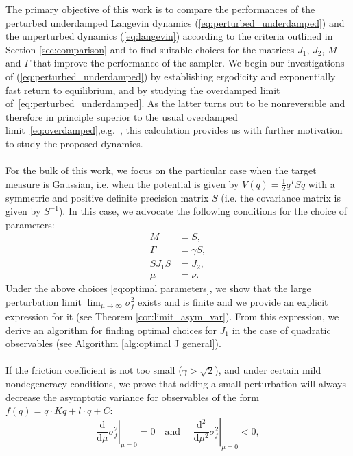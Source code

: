 
The primary objective of this work is to compare the performances of the perturbed underdamped Langevin dynamics (\ref{eq:perturbed_underdamped}) and the unperturbed dynamics (\ref{eq:langevin}) according to the criteria outlined in Section \ref{sec:comparison} and to find suitable choices for the matrices $J_{1}$, $J_{2}$, $M$ and $\Gamma$ that improve the performance of the sampler.  We begin our investigations of (\ref{eq:perturbed_underdamped}) by establishing ergodicity and exponentially fast return to equilibrium, and by studying the overdamped limit of~\eqref{eq:perturbed_underdamped}. As the latter turns out to be nonreversible and therefore in principle superior to the usual overdamped limit~\eqref{eq:overdamped},e.g.~\cite{Hwang2005}, this calculation provides us with further motivation to study the proposed dynamics.
\\\\
For the bulk of this work, we focus on the particular case when the target measure is Gaussian, i.e. when the potential is given by $V(q)=\frac{1}{2}q^{T}Sq$
with a symmetric and positive definite precision matrix $S$ (i.e. the covariance matrix is given by $S^{-1}$). In this
case, we advocate the following conditions for the choice of parameters:\begin{subequations}
	\label{eq:optimal parameters}
	\begin{align}
	M & =S,\label{eq:M=00003DS}\\
	\Gamma & =\gamma S,\\
	SJ_{1}S & =J_{2},\label{eq: perturbation condition}\\
	\mu & =\nu.
	\end{align}
\end{subequations}
Under the above choices \eqref{eq:optimal parameters}, we show that the large perturbation limit $\lim_{\mu\rightarrow\infty} \sigma_f^2$ exists and is finite and we provide an explicit expression for it (see Theorem \ref{cor:limit_asym_var}). From this expression, we derive an algorithm for finding optimal choices for $J_1$ in the case of quadratic observables (see Algorithm \ref{alg:optimal J general}).
\\\\
If the friction coefficient is not too small ($\gamma > \sqrt {2}$), and under certain mild nondegeneracy conditions, we prove that adding a small perturbation will always decrease the asymptotic variance for observables of the form $f(q)=q\cdot Kq+l\cdot q+C$:
\[
\left. \frac{\mathrm{d}}{\mathrm{d}\mu}\sigma_{f}^{2}\right\rvert_{\mu=0}=0\quad\text{and }\quad \left. \frac{\mathrm{d}^{2}}{\mathrm{d}\mu^{2}}\sigma_{f}^{2}\right\rvert_{\mu=0}<0,
\]
